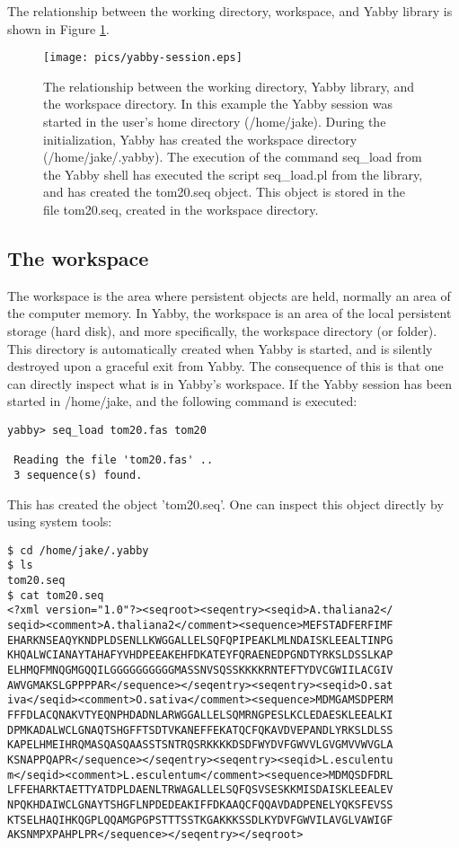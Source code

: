 The relationship between the working directory, workspace, and Yabby
library is shown in Figure \ref{fig:session}.

\begin{figure}
\centering
\texttt{[image: pics/yabby-session.eps]}
\caption{The relationship between the working directory, Yabby
library, and the workspace directory. In this example the Yabby
session was started in the user's home directory (/home/jake).
During the initialization, Yabby has created the workspace directory
(/home/jake/.yabby). The execution of the command seq\_load from
the Yabby shell has executed the script seq\_load.pl from the
library, and has created the tom20.seq object. This object is
stored in the file tom20.seq, created in the workspace directory.}
\label{fig:session}
\end{figure}

\subsection{The workspace}

The workspace is the area where persistent objects are held,
normally an area of the computer memory. In Yabby, the workspace
is an area of the local persistent storage (hard disk), and more
specifically, the workspace directory (or folder). This directory
is automatically created when Yabby is started, and is silently
destroyed upon a graceful exit from Yabby. The consequence of
this is that one can directly inspect what is in Yabby's workspace. 
If the Yabby session has been started in /home/jake, and the
following command is executed:

\begin{verbatim}
yabby> seq_load tom20.fas tom20

 Reading the file 'tom20.fas' ..
 3 sequence(s) found.
\end{verbatim}

This has created the object 'tom20.seq'.  One can inspect this object
directly by using system tools:

\begin{verbatim}
$ cd /home/jake/.yabby
$ ls
tom20.seq
$ cat tom20.seq
<?xml version="1.0"?><seqroot><seqentry><seqid>A.thaliana2</
seqid><comment>A.thaliana2</comment><sequence>MEFSTADFERFIMF
EHARKNSEAQYKNDPLDSENLLKWGGALLELSQFQPIPEAKLMLNDAISKLEEALTINPG
KHQALWCIANAYTAHAFYVHDPEEAKEHFDKATEYFQRAENEDPGNDTYRKSLDSSLKAP
ELHMQFMNQGMGQQILGGGGGGGGGGMASSNVSQSSKKKKRNTEFTYDVCGWIILACGIV
AWVGMAKSLGPPPPAR</sequence></seqentry><seqentry><seqid>O.sat
iva</seqid><comment>O.sativa</comment><sequence>MDMGAMSDPERM
FFFDLACQNAKVTYEQNPHDADNLARWGGALLELSQMRNGPESLKCLEDAESKLEEALKI
DPMKADALWCLGNAQTSHGFFTSDTVKANEFFEKATQCFQKAVDVEPANDLYRKSLDLSS
KAPELHMEIHRQMASQASQAASSTSNTRQSRKKKKDSDFWYDVFGWVVLGVGMVVWVGLA
KSNAPPQAPR</sequence></seqentry><seqentry><seqid>L.esculentu
m</seqid><comment>L.esculentum</comment><sequence>MDMQSDFDRL
LFFEHARKTAETTYATDPLDAENLTRWAGALLELSQFQSVSESKKMISDAISKLEEALEV
NPQKHDAIWCLGNAYTSHGFLNPDEDEAKIFFDKAAQCFQQAVDADPENELYQKSFEVSS
KTSELHAQIHKQGPLQQAMGPGPSTTTSSTKGAKKKSSDLKYDVFGWVILAVGLVAWIGF
AKSNMPXPAHPLPR</sequence></seqentry></seqroot>
\end{verbatim}

